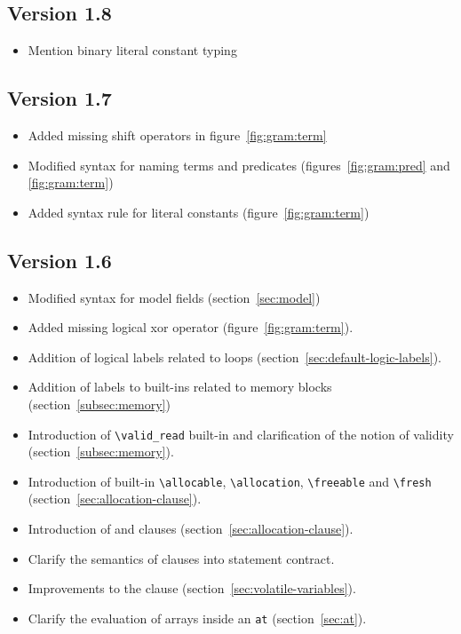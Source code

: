 \subsection{Version 1.8}
\begin{itemize}
\item Mention binary literal constant typing
\end{itemize}

\subsection{Version 1.7}
\begin{itemize}
\item Added missing shift operators in figure~\ref{fig:gram:term}
\item Modified syntax for naming terms and predicates (figures~\ref{fig:gram:pred} and \ref{fig:gram:term})
\item Added syntax rule for literal constants (figure~\ref{fig:gram:term})
\end{itemize}

\subsection{Version 1.6}
\begin{itemize}
\item Modified syntax for model fields (section~\ref{sec:model})
\item Added missing logical xor operator (figure~\ref{fig:gram:term}).
\item Addition of logical labels related to loops
  (section~\ref{sec:default-logic-labels}).
\item Addition of labels to built-ins related to memory blocks
  (section~\ref{subsec:memory})
\item Introduction of \lstinline|\valid_read| built-in and clarification of
  the notion of validity (section~\ref{subsec:memory}).
\item Introduction of built-in \lstinline|\allocable|,
  \lstinline|\allocation|, \lstinline|\freeable| and
  \lstinline|\fresh| (section~\ref{sec:allocation-clause}).
\item Introduction of \allocates and \frees clauses
  (section~\ref{sec:allocation-clause}).
\item Clarify the semantics of \assigns clauses into statement contract.
\item Improvements to the \volatile clause
  (section~\ref{sec:volatile-variables}).
\item Clarify the evaluation of arrays inside an \lstinline|at|
  (section~\ref{sec:at}).
\end{itemize}

